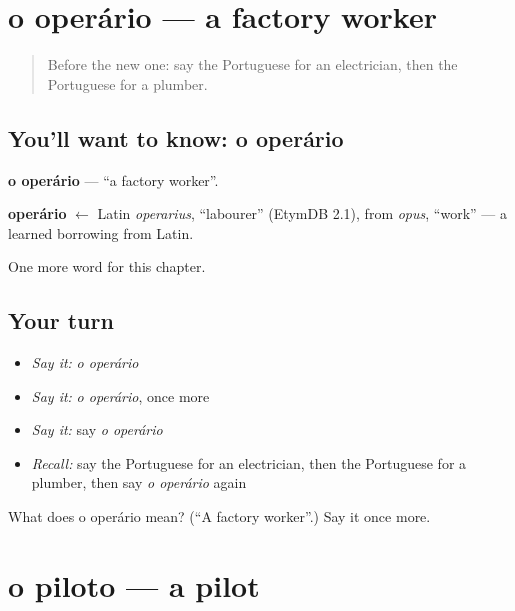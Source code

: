 \section[o operário]{o operário — a factory worker}

\label{lesson:PT-C246-operario}



\begin{quote}
Before the new one: say the Portuguese for an electrician, then the Portuguese for a plumber.
\end{quote}

\subsection*{You'll want to know: o operário}
\textbf{o operário} — \textquotedblleft{}a factory worker\textquotedblright{}.

\begin{cousinweb}
\textbf{operário} $\leftarrow$ Latin \emph{operarius}, \textquotedblleft{}labourer\textquotedblright{} (EtymDB 2.1), from \emph{opus}, \textquotedblleft{}work\textquotedblright{} — a learned borrowing from Latin.
\end{cousinweb}

\begin{grammarlens}[title={What you've built}]
One more word for this chapter.
\end{grammarlens}

\subsection*{Your turn}
\begin{itemize}
\raggedright
  \item \emph{Say it:} \emph{o operário}
  \item \emph{Say it:} \emph{o operário}, once more
  \item \emph{Say it:} say \emph{o operário}
  \item \emph{Recall:} say the Portuguese for an electrician, then the Portuguese for a plumber, then say \emph{o operário} again
\end{itemize}

\begin{tcolorbox}[breakable,colback=teal!4,colframe=teal!35!black,title={Before you move on}]
What does o operário mean? (\textquotedblleft{}A factory worker\textquotedblright{}.) Say it once more.
\end{tcolorbox}
\section[o piloto]{o piloto — a pilot}

